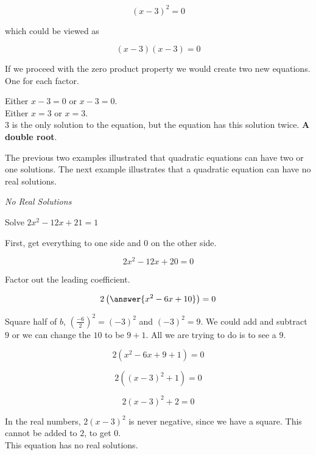\documentclass{ximera}
\begin{document}
\[  (x - 3)^2 = 0  \]

which could be viewed as 

\[  (x - 3) (x - 3) = 0  \]


If we proceed with the zero product property we would create two new equations.  One for each factor.

Either $x - 3 = 0$   or $x - 3 = 0$. \\

Either $x = 3$ or $x = 3$.  \\

$3$ is the only solution to the equation, but the equation has this solution twice. \textbf{\textcolor{red!80!black}{A double root}}.


The previous two examples illustrated that quadratic equations can have two or one solutions.  The next example illustrates that a quadratic equation can have no real solutions.










\begin{example} \textit{No Real Solutions}

Solve $2 x^2 - 12x + 21 = 1$ \\

\begin{explanation}

First, get everything to one side and $0$ on the other side.



\[  2 x^2 - 12x + 20 = 0  \]

Factor out the leading coefficient.

\[  2 \left( \answer{x^2 - 6x + 10} \right) = 0  \]


Square half of $b$, $\left(\frac{-6}{2}\right)^2 = (-3)^2$ and $(-3)^2 = 9$.  We could add and subtract $9$ or we can change the $10$ to be $9+1$.  All we are trying to do is to see a $9$.



\[  2 (x^2 - 6x + 9 + 1) = 0  \]


\[  2 ((x-3)^2 + 1) = 0  \]


\[  2 (x-3)^2 + 2 = 0  \]

In the real numbers, $2 (x-3)^2$ is never negative, since we have a square.  This cannot be added to $2$, to get $0$.  \\


This equation has no real solutions.


\end{explanation}
\end{example}
\end{document}

